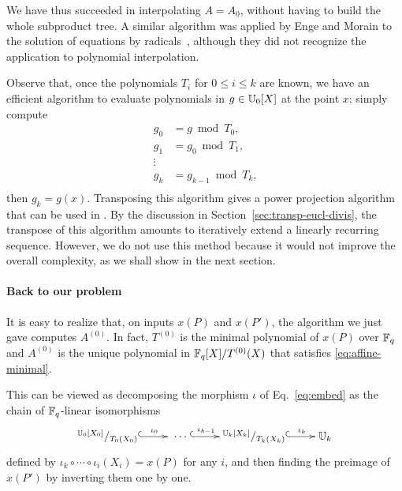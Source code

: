  We have thus succeeded
in interpolating $A=A_0$, without having to build the whole subproduct
tree. A similar algorithm was applied by Enge and Morain to the
solution of equations by radicals~\cite{enge+morain03}, although they
did not recognize the application to polynomial interpolation.

\begin{remark}
  Observe that, once the polynomials $T_i$ for $0\le i\le k$ are
  known, we have an efficient algorithm to evaluate polynomials in
  $g\in\mathbb{U}_0[X]$ at the point $x$: simply compute
  \begin{equation}
    \label{eq:191}
    \begin{aligned}
      g_0 &= g\bmod T_0\text{,}\\
      g_1 &= g_0\bmod T_1\text{,}\\
      \vdots\\
      g_k &= g_{k-1}\bmod T_k\text{,}\\
    \end{aligned}
  \end{equation}
  then $g_k=g(x)$. Transposing this algorithm gives a power projection
  algorithm that can be used in \hyperref[alg:rur]{}. By the discussion in
  Section~\ref{sec:transp-eucl-divis}, the
  transpose of this algorithm
  amounts to iteratively extend a linearly recurring
  sequence. However, we do not use this method because it would not
  improve the overall complexity, as we shall show in the next
  section.
\end{remark}


\paragraph{Back to our problem}
It is easy to realize that, on inputs $x(P)$ and $x(P')$, the
algorithm we just gave computes $A^{(0)}$. In fact, $T^{(0)}$ is
the minimal polynomial of $x(P)$ over $\mathbb{F}_q$ and $A^{(0)}$ is the
unique polynomial in $\mathbb{F}_q[X]/T^{(0)}(X)$ that satisfies
\eqref{eq:affine-minimal}.

This can be viewed as decomposing the morphism $\iota$ of
Eq.~\eqref{eq:embed} as the chain of $\mathbb{F}_q$-linear isomorphisms
\begin{equation}
  \xymatrix{
    ^{\U_0[X_0]}/_{T_0(X_0)} \ar@{^{(}->}[r]^-{\iota_0} &
    \;\cdots\; \ar@{^{(}->}[r]^-{\iota_{k-1}} &
    ^{\U_k[X_k]}/_{T_k(X_k)} \ar@{^{(}->}[r]^-{\iota_k} &
    \U_k
  }
\end{equation}
defined by $\iota_k\circ\cdots\circ\iota_i(X_i) = x(P)$ for any $i$,
and then finding the preimage of $x(P')$ by inverting them one by
one.


